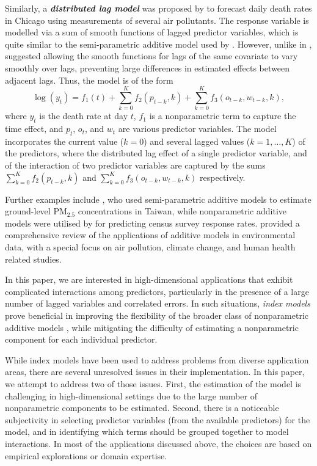 \documentclass[
  11pt,
  a4paper,
]{article}
\begin{document}
Similarly, a \textbf{\emph{distributed lag model}} was proposed by
\textcite{Wood2017} to forecast daily death rates in Chicago using
measurements of several air pollutants. The response variable is
modelled via a sum of smooth functions of lagged predictor variables,
which is quite similar to the semi-parametric additive model used by
\textcite{FH2012}. However, unlike in \textcite{FH2012},
\textcite{Wood2017} suggested allowing the smooth functions for lags of
the same covariate to vary smoothly over lags, preventing large
differences in estimated effects between adjacent lags. Thus, the model
is of the form \[
 \log(y_{t}) = f_{1}(t) + \sum_{k=0}^{K} f_{2}(p_{t-k}, k) + \sum_{k=0}^{K} f_{3}(o_{t-k}, w_{t-k}, k),
\] where \(y_{t}\) is the death rate at day \(t\), \(f_{1}\) is a
nonparametric term to capture the time effect, and \(p_t\), \(o_t\), and
\(w_t\) are various predictor variables. The model incorporates the
current value (\(k = 0\)) and several lagged values
(\(k = 1, \dots, K\)) of the predictors, where the distributed lag
effect of a single predictor variable, and of the interaction of two
predictor variables are captured by the sums
\(\sum_{k=0}^{K} f_{2}(p_{t-k}, k)\) and
\(\sum_{k=0}^{K} f_{3}(o_{t-k}, w_{t-k}, k)\) respectively.

Further examples include \textcite{Ho2020}, who used semi-parametric
additive models to estimate ground-level \(\text{PM}_{2.5}\)
concentrations in Taiwan, while nonparametric additive models were
utilised by \textcite{Ibrahim2023} for predicting census survey response
rates. \textcite{Ravindra2019} provided a comprehensive review of the
applications of additive models in environmental data, with a special
focus on air pollution, climate change, and human health related
studies.

In this paper, we are interested in high-dimensional applications that
exhibit complicated interactions among predictors, particularly in the
presence of a large number of lagged variables and correlated errors. In
such situations, \emph{index models} prove beneficial in improving the
flexibility of the broader class of nonparametric additive models
\autocite{Radchenko2015}, while mitigating the difficulty of estimating
a nonparametric component for each individual predictor.

While index models have been used to address problems from diverse
application areas, there are several unresolved issues in their
implementation. In this paper, we attempt to address two of those
issues. First, the estimation of the model is challenging in
high-dimensional settings due to the large number of nonparametric
components to be estimated. Second, there is a noticeable subjectivity
in selecting predictor variables (from the available predictors) for the
model, and in identifying which terms should be grouped together to
model interactions. In most of the applications discussed above, the
choices are based on empirical explorations or domain expertise.
\end{document}
